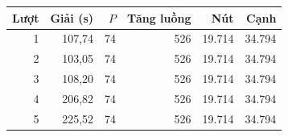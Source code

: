 \small\begin{tabular}{rrrrrr}
\toprule
Lượt & Giải (s) & $P$ & Tăng luồng & Nút & Cạnh\\\midrule
1 & 107,74 & 74 & 526 & 19.714 & 34.794\\
2 & 103,05 & 74 & 526 & 19.714 & 34.794\\
3 & 108,20 & 74 & 526 & 19.714 & 34.794\\
4 & 206,82 & 74 & 526 & 19.714 & 34.794\\
5 & 225,52 & 74 & 526 & 19.714 & 34.794\\
\bottomrule\end{tabular}
